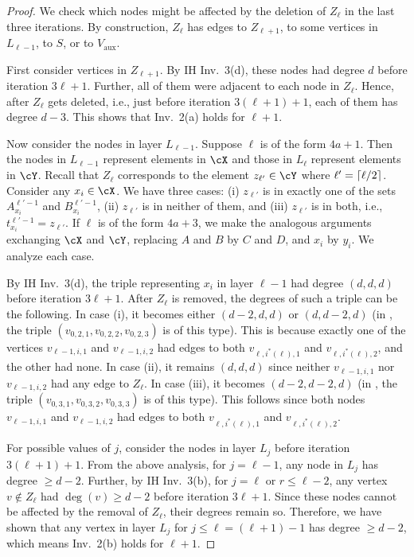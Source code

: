 \documentclass[11pt,letterpaper]{article}
\DeclarePairedDelimiter{\ceil}{\lceil}{\rceil}
\renewcommand{\geq}{\geqslant}
\renewcommand{\leq}{\leqslant}
\theoremstyle{definition}
\newcommand{\Vaux}{V_{\text{aux}}}
\begin{document}
\begin{proof}
We check which nodes might be affected by the deletion of $Z_{\ell}$ in the last three iterations. By construction, $Z_{\ell}$ has edges to $Z_{\ell+1}$, to some vertices in $L_{\ell-1}$, to $S$, or to $\Vaux$. 

First consider vertices in $Z_{\ell+1}$. By IH Inv.~3(d), these nodes had degree $d$ before iteration $3\ell+1$. Further, all of them were adjacent to each node in $Z_\ell$. Hence, after $Z_{\ell}$ gets deleted, i.e., just before iteration $3(\ell+1)+1$, each of them has degree $d-3$. This shows that Inv.~2(a) holds for $\ell+1$. 

 Now consider the nodes in layer $L_{\ell-1}$. Suppose $\ell$ is of the form $4a+1$. Then the nodes in $L_{\ell-1}$ represent elements in $\cX$ and those in $L_\ell$ represent elements in $\cY$. Recall that $Z_{\ell}$ corresponds to the element $z_{\ell'}\in \cY$ where $\ell'=\ceil{\ell/2}$. Consider any $x_i\in \cX$. We have three cases: (i) $z_{\ell'}$ is in exactly one of the sets $A_{x_i}^{\ell'-1}$ and $B_{x_i}^{\ell'-1}$, (ii) $z_{\ell'}$ is in neither of them, and (iii) $z_{\ell'}$ is in both, i.e., $t_{x_i}^{\ell'-1}=z_{\ell'}$. If $\ell$ is of the form $4a+3$, we make the analogous arguments exchanging $\cX$ and $\cY$, replacing $A$ and $B$ by $C$ and $D$, and $x_i$ by $y_i$. We analyze each case.
 
 By IH Inv.~3(d), the triple representing $x_i$ in layer $\ell-1$ had degree $(d,d,d)$ before iteration $3\ell+1$. After $Z_{\ell}$ is removed, the degrees of such a triple can be the following. In case (i), it becomes either $(d-2,d,d)$ or $(d,d-2,d)$ (in , the triple $(v_{0,2,1}, v_{0,2,2}, v_{0,2,3})$ is of this type). This is because exactly one of the vertices $v_{\ell-1,i,1}$ and $v_{\ell-1,i,2}$ had edges to both $v_{\ell,i^*(\ell),1}$ and $v_{\ell,i^*(\ell),2}$, and the other had none. In case (ii), it remains $(d,d,d)$ since neither $v_{\ell-1,i,1}$ nor $v_{\ell-1,i,2}$ had any edge to $Z_{\ell}$. In case (iii), it becomes $(d-2,d-2,d)$ (in , the triple $(v_{0,3,1}, v_{0,3,2}, v_{0,3,3})$ is of this type). This follows since both nodes $v_{\ell-1,i,1}$ and $v_{\ell-1,i,2}$ had edges to both $v_{\ell,i^*(\ell),1}$ and $v_{\ell,i^*(\ell),2}$. 
 
 For possible values of $j$, consider the nodes in layer $L_j$ before iteration $3(\ell+1)+1$. From the above analysis, for $j=\ell-1$, any node in $L_j$ has degree $\geq d-2$. Further, by IH Inv.~3(b), for $j=\ell$ or $r\leq \ell-2$, any vertex $v\not\in Z_{\ell}$ had $\deg(v)\geq d-2$ before iteration $3\ell+1$. Since these nodes cannot be affected by the removal of $Z_{\ell}$, their degrees remain so. Therefore, we have shown that any vertex in layer $L_j$ for $j\leq \ell=(\ell+1)-1$ has degree $\geq d-2$, which means Inv.~2(b) holds for $\ell+1$. 


\end{proof}
\end{document}
